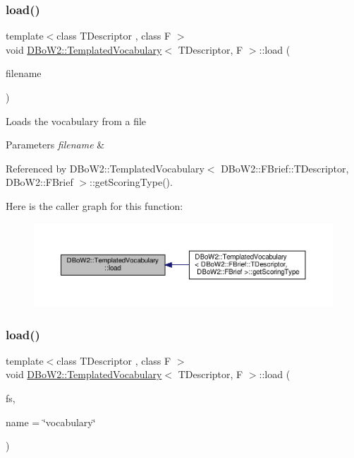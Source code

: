 \subsubsection{\texorpdfstring{load()}{load()}\hspace{0.1cm}{\footnotesize\ttfamily [1/2]}}
{\footnotesize\ttfamily template$<$class T\+Descriptor , class F $>$ \\
void \hyperlink{classDBoW2_1_1TemplatedVocabulary}{D\+Bo\+W2\+::\+Templated\+Vocabulary}$<$ T\+Descriptor, F $>$\+::load (\begin{DoxyParamCaption}\item[{const std\+::string \&}]{filename }\end{DoxyParamCaption})}

Loads the vocabulary from a file 
\begin{DoxyParams}{Parameters}
{\em filename} & \\
\hline
\end{DoxyParams}


Referenced by D\+Bo\+W2\+::\+Templated\+Vocabulary$<$ D\+Bo\+W2\+::\+F\+Brief\+::\+T\+Descriptor, D\+Bo\+W2\+::\+F\+Brief $>$\+::get\+Scoring\+Type().

Here is the caller graph for this function\+:\nopagebreak
\begin{figure}[H]
\begin{center}
\leavevmode
\includegraphics[width=350pt]{classDBoW2_1_1TemplatedVocabulary_afdec2031c98b9109451b1454f73348b0_icgraph}
\end{center}
\end{figure}
\mbox{\label{classDBoW2_1_1TemplatedVocabulary_a037ba240314ff30f3620fb4de6845c66}} 
\subsubsection{\texorpdfstring{load()}{load()}\hspace{0.1cm}{\footnotesize\ttfamily [2/2]}}
{\footnotesize\ttfamily template$<$class T\+Descriptor , class F $>$ \\
void \hyperlink{classDBoW2_1_1TemplatedVocabulary}{D\+Bo\+W2\+::\+Templated\+Vocabulary}$<$ T\+Descriptor, F $>$\+::load (\begin{DoxyParamCaption}\item[{const cv\+::\+File\+Storage \&}]{fs,  }\item[{const std\+::string \&}]{name = {\ttfamily \char`\"{}vocabulary\char`\"{}} }\end{DoxyParamCaption})\hspace{0.3cm}{\ttfamily [virtual]}}

